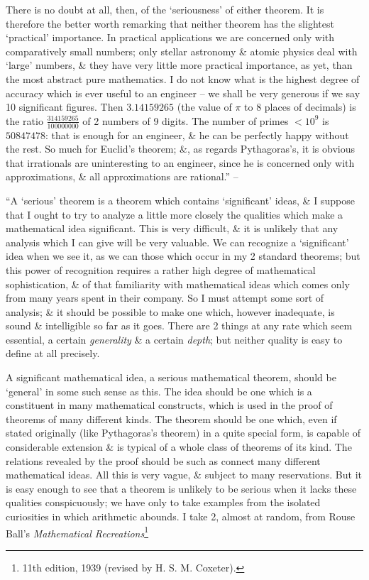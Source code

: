\documentclass{article}
\numberwithin{equation}{section}
\begin{document}
There is no doubt at all, then, of the `seriousness' of either theorem. It is therefore the better worth remarking that neither theorem has the slightest `practical' importance. In practical applications we are concerned only with comparatively small numbers; only stellar astronomy \& atomic physics deal with `large' numbers, \& they have very little more practical importance, as yet, than the most abstract pure mathematics. I do not know what is the highest degree of accuracy which is ever useful to an engineer -- we shall be very generous if we say 10 significant figures. Then $3.14159265$ (the value of $\pi$ to 8 places of decimals) is the ratio $\frac{314159265}{100000000}$ of 2 numbers of 9 digits. The number of primes $<10^9$ is $50847478$: that is enough for an engineer, \& he can be perfectly happy without the rest. So much for Euclid's theorem; \&, as regards Pythagoras's, it is obvious that irrationals are uninteresting to an engineer, since he is concerned only with approximations, \& all approximations are rational.'' -- \cite[pp. 99--102]{Hardy1992}

 ``A `serious' theorem is a theorem which contains `significant' ideas, \& I suppose that I ought to try to analyze a little more closely the qualities which make a mathematical idea significant. This is very difficult, \& it is unlikely that any analysis which I can give will be very valuable. We can recognize a `significant' idea when we see it, as we can those which occur in my 2 standard theorems; but this power of recognition requires a rather high degree of mathematical sophistication, \& of that familiarity with mathematical ideas which comes only from many years spent in their company. So I must attempt some sort of analysis; \& it should be possible to make one which, however inadequate, is sound \& intelligible so far as it goes. There are 2 things at any rate which seem essential, a certain \textit{generality} \& a certain \textit{depth}; but neither quality is easy to define at all precisely.

A significant mathematical idea, a serious mathematical theorem, should be `general' in some such sense as this. The idea should be one which is a constituent in many mathematical constructs, which is used in the proof of theorems of many different kinds. The theorem should be one which, even if stated originally (like Pythagoras's theorem) in a quite special form, is capable of considerable extension \& is typical of a whole class of theorems of its kind. The relations revealed by the proof should be such as connect many different mathematical ideas. All this is very vague, \& subject to many reservations. But it is easy enough to see that a theorem is unlikely to be serious when it lacks these qualities conspicuously; we have only to take examples from the isolated curiosities in which arithmetic abounds. I take 2, almost at random, from Rouse Ball's \textit{Mathematical Recreations}\footnote{11th edition, 1939 (revised by H. S. M. Coxeter).}
\end{document}
